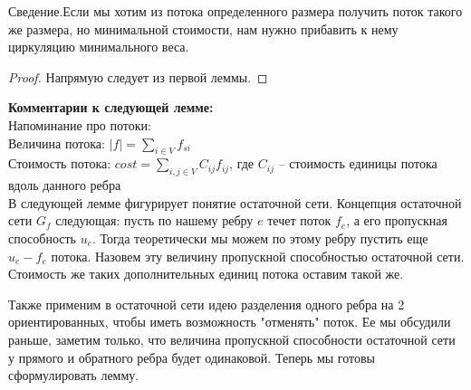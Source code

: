 \begin{lemma}
	Сведение.Если мы хотим из потока определенного размера получить поток такого же размера, но минимальной стоимости, нам нужно прибавить к нему циркуляцию минимального веса.
\end{lemma}
\begin{proof}
	Напрямую следует из первой леммы.
\end{proof}

{\bfseries Комментарии к следующей лемме:}\\

Напоминание про потоки:\\
Величина потока: $|f| = \sum_{i\in V} f_{si}$  \\
Стоимость потока: $cost = \sum_{i,j\in V} C_{ij}f_{ij} $, где $C_{ij}$ -- стоимость единицы потока вдоль данного ребра\\
	
В следующей лемме фигурирует понятие остаточной сети. Концепция остаточной сети $G_f$ следующая: пусть по нашему ребру $e$ течет поток $f_e$, а его пропускная способность $u_e$. Тогда теоретически мы можем по этому ребру пустить еще $u_e - f_e$ потока. Назовем эту величину 
пропускной способностью остаточной сети. Стоимость же таких дополнительных единиц потока оставим такой же.

Также применим в остаточной сети идею разделения одного ребра на 2 ориентированных, чтобы иметь возможность "отменять" поток. Ее мы обсудили раньше, заметим только, что величина пропускной способности остаточной 
сети у прямого и обратного ребра будет одинаковой. Теперь мы готовы сформулировать лемму.

